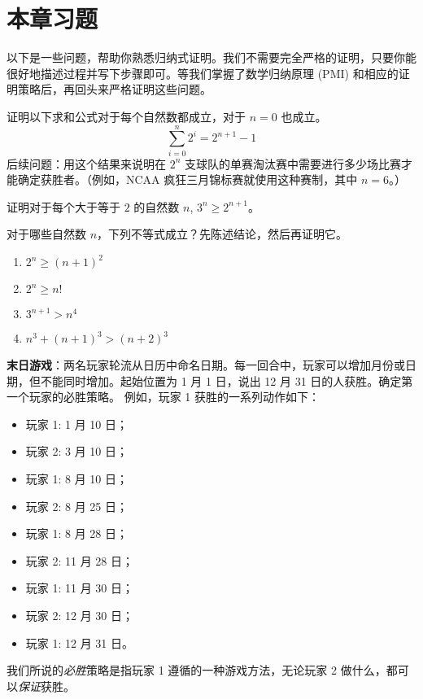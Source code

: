\section{本章习题}

以下是一些问题，帮助你熟悉归纳式证明。我们不需要完全严格的证明，只要你能很好地描述过程并写下步骤即可。等我们掌握了数学归纳原理 (PMI) 和相应的证明策略后，再回头来严格证明这些问题。

\begin{exercise} \label{exc:exercises2.7.1}
    证明以下求和公式对于每个自然数都成立，对于 $n=0$ 也成立。
    \[\sum_{i=0}^{n}2^i=2^{n+1}-1\]
    后续问题：用这个结果来说明在 $2^n$ 支球队的单赛淘汰赛中需要进行多少场比赛才能确定获胜者。（例如，NCAA 疯狂三月锦标赛就使用这种赛制，其中 $n = 6$。）
\end{exercise}

\begin{exercise}
    证明对于每个大于等于 $2$ 的自然数 $n$, $3^n \ge 2^{n+1}$。
\end{exercise}

\begin{exercise}
    对于哪些自然数 $n$，下列不等式成立？先陈述结论，然后再证明它。
    \begin{enumerate}
        \item $2^n \ge (n + 1)^2$
        \item $2^n \ge n!$
        \item $3^{n+1} > n^4$
        \item $n^3 + (n + 1)^3 > (n + 2)^3$
    \end{enumerate}
\end{exercise}

\begin{exercise}
    \textbf{末日游戏}：两名玩家轮流从日历中命名日期。每一回合中，玩家可以增加月份或日期，但不能同时增加。起始位置为 1 月 1 日，说出 12 月 31 日的人获胜。确定第一个玩家的必胜策略。
    例如，玩家 1 获胜的一系列动作如下：
    \begin{itemize}
        \item 玩家 1: 1 月 10 日；
        \item 玩家 2: 3 月 10 日；
        \item 玩家 1: 8 月 10 日；
        \item 玩家 2: 8 月 25 日；
        \item 玩家 1: 8 月 28 日；
        \item 玩家 2: 11 月 28 日；
        \item 玩家 1: 11 月 30 日；
        \item 玩家 2: 12 月 30 日；
        \item 玩家 1: 12 月 31 日。
    \end{itemize}
    我们所说的\emph{必胜}策略是指玩家 1 遵循的一种游戏方法，无论玩家 2 做什么，都可以\emph{保证}获胜。
\end{exercise}

